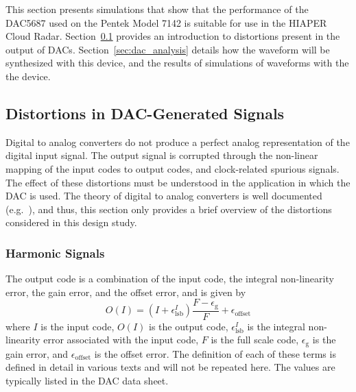 \documentclass[12pt,letterpaper]{article}
\begin{document}
This section presents simulations that show that the performance of
the DAC5687 used on the Pentek Model 7142 is suitable for use in the
HIAPER Cloud Radar. Section~\ref{sec:dac_distortions} provides an
introduction to distortions present in the output of
DACs. Section~\ref{sec:dac_analysis} details how the waveform will be
synthesized with this device, and the results of simulations of
waveforms with the the device.

\subsection{Distortions in DAC-Generated Signals}
\label{sec:dac_distortions}

Digital to analog converters do not produce a perfect analog
representation of the digital input signal. The output signal is
corrupted through the non-linear mapping of the input codes to output
codes, and clock-related spurious signals. The effect of these
distortions must be understood in the application in which the DAC is
used. The theory of digital to analog converters is well documented
(e.g.~\cite{slaa013}), and thus, this section only provides a brief
overview of the distortions considered in this design study.

\subsubsection{Harmonic Signals}
\label{sec:harmonic_spurious}

The output code is a combination of the input code, the integral
non-linearity error, the gain error, and the offset error, and is
given by
\begin{equation}
  O(I)=\left(I+\epsilon_\text{lsb}^I\right)\frac{F-\epsilon_\text{g}}{F}+\epsilon_\text{offset}
\end{equation}
where $I$ is the input code, $O(I)$ is the output code,
$\epsilon_\text{lsb}^I$ is the integral non-linearity error associated
with the input code, $F$ is the full scale code, $\epsilon_\text{g}$
is the gain error, and $\epsilon_\text{offset}$ is the offset
error. The definition of each of these terms is defined in detail in
various texts and will not be repeated here. The values are typically
listed in the DAC data sheet.
\end{document}
